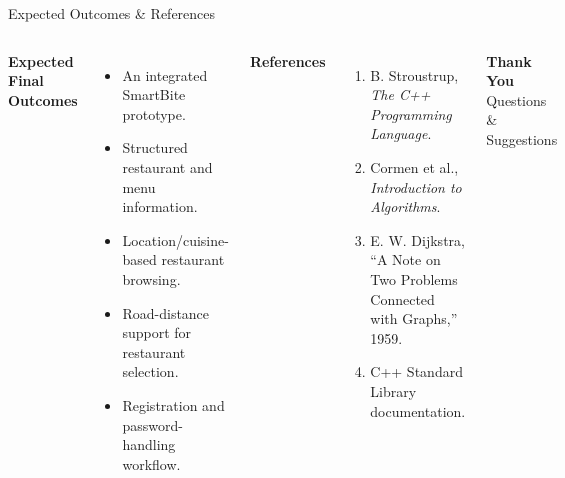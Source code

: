 \documentclass[aspectratio=169,10pt]{beamer}
\begin{document}
\begin{frame}{Expected Outcomes \& References}
\begin{columns}[T,totalwidth=\textwidth]
\textbf{\color{GEUBlue}Expected Final Outcomes}
\begin{itemize}\itemsep3pt
\item An integrated SmartBite prototype.
\item Structured restaurant and menu information.
\item Location/cuisine-based restaurant browsing.
\item Road-distance support for restaurant selection.
\item Registration and password-handling workflow.
\end{itemize}
\textbf{\color{GEUBlue}References}
\begin{enumerate}\itemsep3pt
\item B. Stroustrup, \textit{The C++ Programming Language}.
\item Cormen et al., \textit{Introduction to Algorithms}.
\item E. W. Dijkstra, ``A Note on Two Problems Connected with Graphs,'' 1959.
\item C++ Standard Library documentation.
\end{enumerate}
\vfill
\begin{center}
\colorbox{GEUBlue}{\parbox{.78\textwidth}{\centering\color{white}\textbf{Thank You}\\Questions \& Suggestions}}
\end{center}
\end{columns}

\end{frame}
\end{document}
